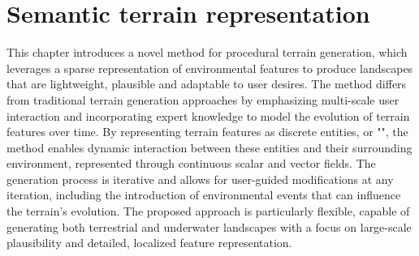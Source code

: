\graphicspath{ {./Chapter 2/figures/} {./Chapter 2/figures/Snake/} {./Chapter 2/figures/Water/} }

\chapter{Semantic terrain representation}
\label{chap:semantic-representation}
\abstract
\label{chap:env-obj_abstract}
This chapter introduces a novel method for procedural terrain generation, which leverages a sparse representation of environmental features to produce landscapes that are lightweight, plausible and adaptable to user desires. The method differs from traditional terrain generation approaches by emphasizing multi-scale user interaction and incorporating expert knowledge to model the evolution of terrain features over time. By representing terrain features as discrete entities, or "", the method enables dynamic interaction between these entities and their surrounding environment, represented through continuous scalar and vector fields. The generation process is iterative and allows for user-guided modifications at any iteration, including the introduction of environmental events that can influence the terrain's evolution. The proposed approach is particularly flexible, capable of generating both terrestrial and underwater landscapes with a focus on large-scale plausibility and detailed, localized feature representation. 
\pagebreak 

\minitoc

